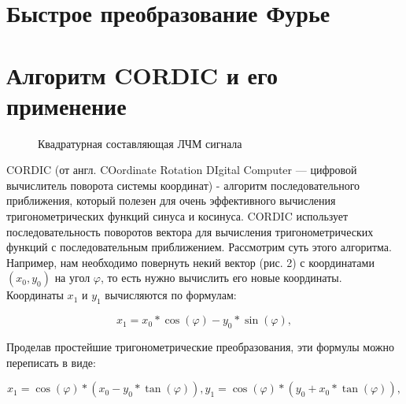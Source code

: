 \documentclass[a4paper,oneside ,10pt]{extreport}
\begin{document}
\section{Быстрое преобразование Фурье}

\section{Алгоритм CORDIC и его применение}

\begin{figure}[h]
    \centering
    \noindent
    \caption{Квадратурная составляющая ЛЧМ сигнала}
    \label{fig:chirp_q}
\end{figure}



CORDIC (от англ. COordinate Rotation DIgital Computer — цифровой вычислитель поворота системы координат) - алгоритм последовательного приближения, который полезен для очень эффективного вычисления тригонометрических функций синуса и косинуса. CORDIC использует последовательность поворотов вектора для вычисления тригонометрических функций с последовательным приближением. Рассмотрим суть этого алгоритма. Например, нам необходимо повернуть некий вектор (рис. 2) с координатами \((x_0, y_0)\) на угол \(\varphi\), то есть нужно вычислить его новые координаты. Координаты \(x_1\) и \(y_1\) вычисляются по формулам:

\begin{displaymath}	
x_{1} = x_0 * \cos(\varphi) - y_{0} * \sin(\varphi),
\end{displaymath}

Проделав простейшие тригонометрические преобразования, эти формулы можно переписать в виде:

\begin{displaymath}	
x_{1} = \cos(\varphi) * (x_{0} - y_{0} * \tan(\varphi)), 
y_{1} = \cos(\varphi) * (y_{0} + x_{0} * \tan(\varphi)),
\end{displaymath}
\end{document}
